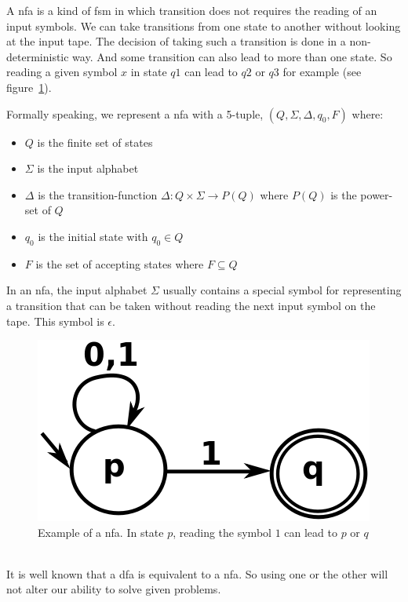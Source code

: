 \documentclass[12pt]{article}
\theoremstyle{definition}
\theoremstyle{definition}
\begin{document}
A \gls{nfa} is a kind of \gls{fsm} in which transition does not requires the reading of an input symbols. We can take transitions from one state to another without looking at the input tape. The decision of taking such a transition is done in a non-deterministic way. And some transition can also lead to more than one state. So reading a given symbol $x$ in state $q1$ can lead to $q2$ or $q3$ for example (see figure~\ref{nfa}).~\cite{FA-DecisionProblems:1959}

Formally speaking, we represent a \gls{nfa} with a 5-tuple, $(Q, \Sigma, \Delta, q_0, F)$ where:

\begin{itemize}
\item $Q$ is the finite set of states
\item $\Sigma$ is the input alphabet
\item $\Delta$ is the transition-function $\Delta: Q \times \Sigma \rightarrow P(Q)$ where $P(Q)$ is the power-set of $Q$
\item $q_0$ is the initial state with $q_0 \in Q$
\item $F$ is the set of accepting states where $F \subseteq Q$
\end{itemize}

In an \gls{nfa}, the input alphabet $\Sigma$ usually contains a special symbol for representing a transition that can be taken without reading the next input symbol on the tape. This symbol is $\epsilon$.\\

\begin{figure}
    \centering
    \includegraphics[scale=0.4]{graph/nfa.png}
    \caption{Example of a \gls{nfa}. In state $p$, reading the symbol $1$ can lead to $p$ or $q$~\cite{NFA:2017}}
    \label{nfa}
\end{figure}

It is well known that a \gls{dfa} is equivalent to a \gls{nfa}. So using one or the other will not alter our ability to solve given problems.
\end{document}
